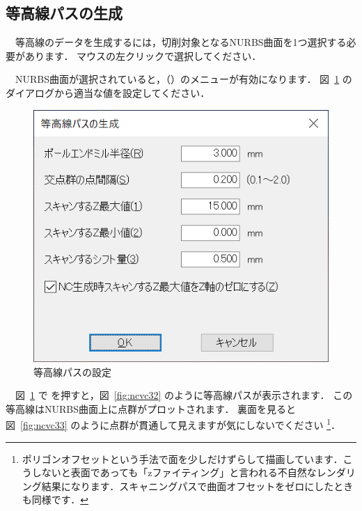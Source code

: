 
\subsection{等高線パスの生成}
　等高線のデータを生成するには，切削対象となるNURBS曲面を1つ選択する必要があります．
マウスの左クリックで選択してください．

　NURBS曲面が選択されていると，（）のメニューが有効になります．
図~\ref{fig:ncvc31} のダイアログから適当な値を設定してください．

\begin{figure}[H]
\centering
\includegraphics{No3/fig/fig31.png}
\caption{等高線パスの設定}
\label{fig:ncvc31}
\end{figure}

　図~\ref{fig:ncvc31} で  を押すと，図~\ref{fig:ncvc32} のように等高線パスが表示されます．
この等高線はNURBS曲面上に点群がプロットされます．
裏面を見ると 図~\ref{fig:ncvc33} のように点群が貫通して見えますが気にしないでください
\footnote{ポリゴンオフセットという手法で面を少しだけずらして描画しています．こうしないと表面であっても「zファイティング」と言われる不自然なレンダリング結果になります．スキャニングパスで曲面オフセットをゼロにしたときも同様です．}．

